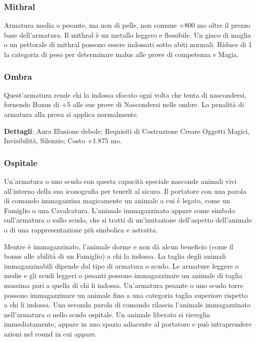 \begin{multicols}{2}
\subsubsection*{Mithral}

Armatura media o pesante, ma non di pelle, non comune +800 mo oltre il prezzo base dell'armatura. Il mithral è un metallo leggero e flessibile. Un giaco di maglia o un pettorale di mithral possono essere indossati sotto abiti normali. Riduce di 1 la categoria di peso per determinare malus alle prove di competenza e Magia.

\subsubsection*{Ombra}

Quest'armatura rende chi la indossa sfocato ogni volta che tenta di nascondersi, fornendo Bonus di +5 alle sue prove di Nascondersi nelle ombre. La penalità di armatura alla prova si applica normalmente.

\textbf{Dettagli}: Aura Illusione debole; Requisiti di Costruzione Creare Oggetti Magici, Invisibilità, Silenzio; Costo +1.875 mo.

\subsubsection*{Ospitale}

Un'armatura o uno scudo con questa capacità speciale nasconde animali vivi all'interno della sua iconografia per tenerli al sicuro. Il portatore con una parola di comando immagazzina magicamente un animale a cui è legato, come un Famiglio o una Cavalcatura. L'animale immagazzinato appare come simbolo sull'armatura o sullo scudo, che si tratti di un'imitazione dell'aspetto dell'animale o di una rappresentazione più simbolica e astratta.

Mentre è immagazzinato, l'animale dorme e non dà alcun beneficio (come il bonus alle abilità di un Famiglio) a chi la indossa. La taglia degli animali immagazzinabili dipende dal tipo di armatura o scudo. Le armature leggere o medie e gli scudi leggeri o pesanti possono immagazzinare un animale di taglia massima pari a quella di chi li indossa. Un'armatura pesante o uno scudo torre possono immagazzinare un animale fino a una categoria taglia superiore rispetto a chi li indossa. Una seconda parola di comando rilascia l'animale immagazzinato nell'armatura o nello scudo ospitale. Un animale liberato si risveglia immediatamente, appare in uno spazio adiacente al portatore e può intraprendere azioni nel round in cui appare.


\end{multicols}

